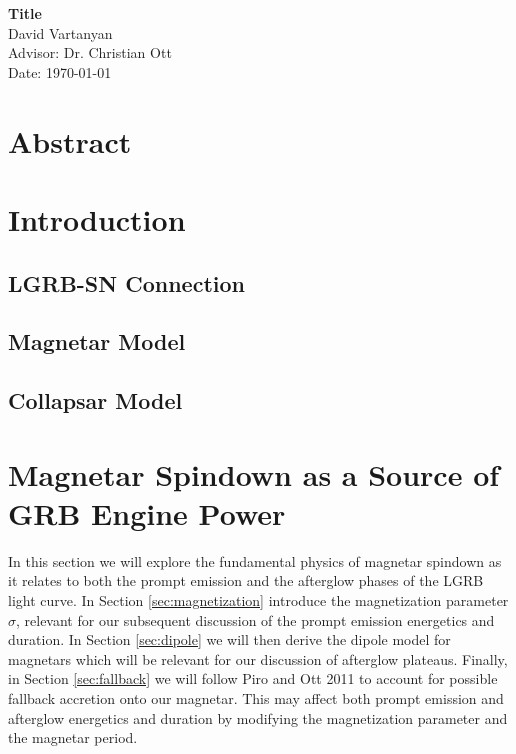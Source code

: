 \documentclass{article}
\begin{document}
\thispagestyle{empty}

\begin{center}
\Huge
\vspace*{7 cm}
{\bf Title}\\
\vspace{5 cm}
\large
David Vartanyan\\
Advisor: Dr. Christian Ott\\
Date: \today
\end{center}

\newpage
\thispagestyle{empty}
\mbox{}

\newpage
{\centering\section*{Abstract}}
\setcounter{page}{1}

\newpage
\thispagestyle{empty}
\mbox{}
\newpage

{\centering\tableofcontents}
\setcounter{page}{1}
\newpage

\section{Introduction}

\subsection{LGRB-SN Connection}

\subsection{Magnetar Model}

\subsection{Collapsar Model}

\section{Magnetar Spindown as a Source of GRB Engine Power}
In this section we will explore the fundamental physics of magnetar spindown as it relates to both the prompt emission and the afterglow phases of the LGRB light curve. In Section \ref{sec:magnetization} introduce the magnetization parameter $\sigma$, relevant for our subsequent discussion of the prompt emission energetics and duration. In Section \ref{sec:dipole} we will then derive the dipole model for magnetars which will be relevant for our discussion of afterglow plateaus. Finally, in Section \ref{sec:fallback} we will follow Piro and Ott 2011 \cite{Piro:2011ed} to account for possible fallback accretion onto our magnetar. This may affect both prompt emission and afterglow energetics and duration by modifying the magnetization parameter and the magnetar period.
\end{document}
